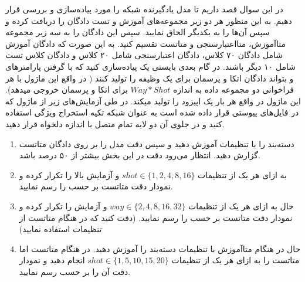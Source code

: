 \documentclass{article}
\begin{document}
در این سوال قصد داریم تا مدل یادگیرنده
شبکه
\href{https://arxiv.org/abs/1703.05175}{}
را مورد پیاده‌سازی و بررسی قرار دهیم. به این منظور هر دو زیر مجموعه‌های آموزش و تست دادگان
را دریافت کرده و سپس آن‌ها را به یکدیگر الحاق نمایید. 
سپس این دادگان را به سه زیر مجموعه
متاآموزش، متااعتبارسنجی و متاتست تقسیم کنید. به این صورت که دادگان آموزش شامل دادگان ۷۰ کلاس، دادگان اعتبارسنجی شامل ۲۰ کلاس و دادگان  کلاس تست شامل ۱۰ دیگر باشند.
در گام بعدی بایستی یک 
پیاده‌سازی کنید که با گرفتن پارامترهای
و
بتواند دادگان
اتکا و پرسمان برای یک وظیفه را تولید کنند ( در واقع این ماژول با هر فراخوانی دو مجموعه داده به اندازه
$Way * Shot$
برای اتکا و پرسمان خروجی میدهد). این ماژول در واقع هر بار یک اپیزود را تولید میکند.
در طی آزمایش‌های زیر از ماژول
که در فایل‌های پیوستی قرار داده شده است به عنوان شبکه  تکیه استخراج ویژگی استفاده کنید و در جلوی آن دو لایه تمام متصل با اندازه دلخواه قرار دهید.

\begin{enumerate}


\item
دسته‌بند را با تنظیمات
آموزش دهید و سپس دقت مدل را بر روی دادگان متاتست گزارش دهید.
انتظار می‌رود دقت در این بخش بیشتر از ۵۰ درصد باشد.

\item
به ازای هر یک از تنظیمات
$shot \in \{1, 2, 4, 8, 16\}$
و
آزمایش بالا را تکرار کرده و نمودار دقت متاتست بر حسب
را رسم نمایید.

\item
حال به ازای هر یک از تنظیمات
$way \in \{2, 4, 8, 16, 32\}$
و
آزمایش را تکرار کرده و نمودار دقت متاتست بر حسب
را رسم نمایید.
(دقت کنید که در هنگام متاتست از تنظیمات
استفاده نمایید)


\item
حال در هنگام متاآموزش با تنظیمات
دسته‌بند را آموزش دهید.
در هنگام متاتست اما متاتست را به ازای هر یک از تنظیمات
$shot \in \{1, 5,10, 15, 20\} $
انجام دهید و نمودار دقت آن را بر حسب 
رسم نمایید.

\end{enumerate}
\end{document}
